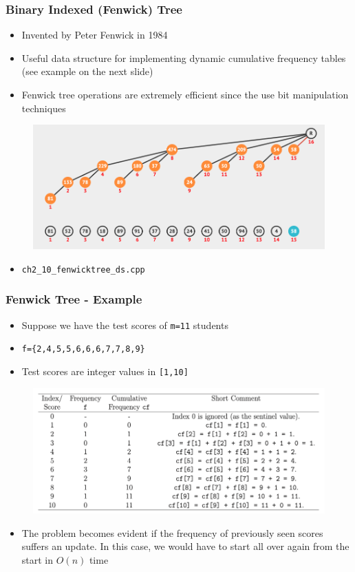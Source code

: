 \documentclass{beamer}
\begin{document}
\begin{frame}[fragile]
\frametitle{Binary Indexed (Fenwick) Tree}
	\begin{itemize}
	    \item Invented by Peter Fenwick in 1984
	    \item Useful data structure for implementing dynamic cumulative frequency tables (see example on the next slide)
	    \item Fenwick tree operations are extremely efficient since the use bit manipulation techniques
	\end{itemize}
	\begin{figure}
	    \centering
	    \includegraphics[scale=0.2]{imgs/2.4/fenwick-tree/fenwick-tree.png}
	\end{figure}
	\begin{itemize}
	    \item \color{red}\verb|ch2_10_fenwicktree_ds.cpp|\color{black}
	\end{itemize}
\end{frame}

\begin{frame}[fragile]
\frametitle{Fenwick Tree - Example}
	\begin{itemize}
	    \item Suppose we have the test scores of \verb|m=11| students
	    \item \verb|f={2,4,5,5,6,6,6,7,7,8,9}|
	    \item Test scores are integer values in \verb|[1,10]|
	\end{itemize}
	\begin{figure}
	    \centering
	    \includegraphics[scale=0.25]{imgs/2.4/fenwick-tree/ft.png}
	\end{figure}
	\begin{itemize}
	    \item The problem becomes evident if the frequency of previously seen scores suffers an update. In this case, we would have to start all over again from the start in $O(n)$ time
	\end{itemize}
\end{frame}
\end{document}
